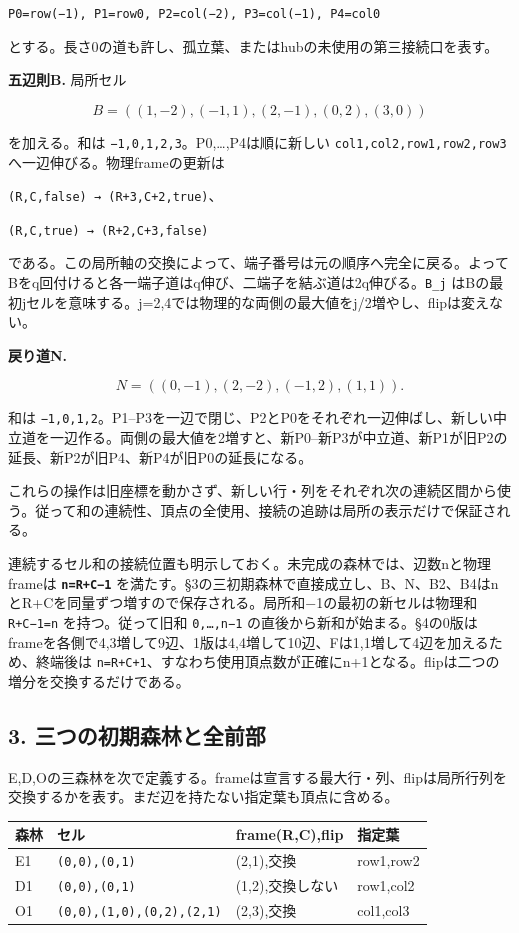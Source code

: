 \documentclass[
  10pt,
  a4paper,
]{article}
\let\originaltexttt\texttt
\renewcommand{\texttt}[1]{\leavevmode\allowbreak\mbox{\originaltexttt{#1}}}
\begin{document}
\texttt{P0=row(−1),\ P1=row0,\ P2=col(−2),\ P3=col(−1),\ P4=col0}

とする。長さ0の道も許し、孤立葉、またはhubの未使用の第三接続口を表す。

\textbf{五辺則B.} 局所セル

\[
B=((1,-2),(-1,1),(2,-1),(0,2),(3,0))
\]

を加える。和は \texttt{−1,0,1,2,3}。P0,\ldots,P4は順に新しい
\texttt{col1,col2,row1,row2,row3} へ一辺伸びる。物理frameの更新は

\texttt{(R,C,false)\ →\ (R+3,C+2,true)}、

\texttt{(R,C,true)\ →\ (R+2,C+3,false)}

である。この局所軸の交換によって、端子番号は元の順序へ完全に戻る。よってBをq回付けると各一端子道はq伸び、二端子を結ぶ道は2q伸びる。\texttt{B\_j}
はBの最初jセルを意味する。j=2,4では物理的な両側の最大値をj/2増やし、flipは変えない。

\textbf{戻り道N.}

\[
N=((0,-1),(2,-2),(-1,2),(1,1)).
\]

和は
\texttt{−1,0,1,2}。P1--P3を一辺で閉じ、P2とP0をそれぞれ一辺伸ばし、新しい中立道を一辺作る。両側の最大値を2増すと、新P0--新P3が中立道、新P1が旧P2の延長、新P2が旧P4、新P4が旧P0の延長になる。

これらの操作は旧座標を動かさず、新しい行・列をそれぞれ次の連続区間から使う。従って和の連続性、頂点の全使用、接続の追跡は局所の表示だけで保証される。

連続するセル和の接続位置も明示しておく。未完成の森林では、辺数nと物理frameは
\textbf{\texttt{n=R+C−1}}
を満たす。§3の三初期森林で直接成立し、B、N、B2、B4はnとR+Cを同量ずつ増すので保存される。局所和−1の最初の新セルは物理和
\texttt{R+C−1=n} を持つ。従って旧和 \texttt{0,…,n−1}
の直後から新和が始まる。§4の0版はframeを各側で4,3増して9辺、1版は4,4増して10辺、Fは1,1増して4辺を加えるため、終端後は
\texttt{n=R+C+1}、すなわち使用頂点数が正確にn+1となる。flipは二つの増分を交換するだけである。

\subsection{3.
三つの初期森林と全前部}\label{ux4e09ux3064ux306eux521dux671fux68eeux6797ux3068ux5168ux524dux90e8}

E,D,Oの三森林を次で定義する。frameは宣言する最大行・列、flipは局所行列を交換するかを表す。まだ辺を持たない指定葉も頂点に含める。

\begin{center}
\begin{tabular}{@{}llll@{}}
\toprule\noalign{}
森林 & セル & frame(R,C),flip & 指定葉 \\
\midrule\noalign{}
E1 & \texttt{(0,0),(0,1)} & (2,1),交換 & row1,row2 \\
D1 & \texttt{(0,0),(0,1)} & (1,2),交換しない & row1,col2 \\
O1 & \texttt{(0,0),(1,0),(0,2),(2,1)} & (2,3),交換 & col1,col3 \\
\bottomrule
\end{tabular}
\end{center}
\end{document}
